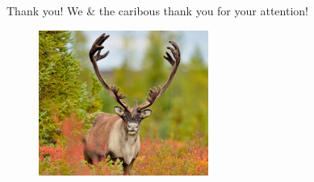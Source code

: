 \documentclass[aspectratio=43]{beamer}
\begin{document}
\begin{frame}{Thank you!}
	\bigskip\bigskip
	\centering
	We \& the caribous thank you for your attention!
	\begin{figure}
		\includegraphics[height=180]{img/caribou.jpg}	
	
	\end{figure}
\end{frame}
\end{document}
